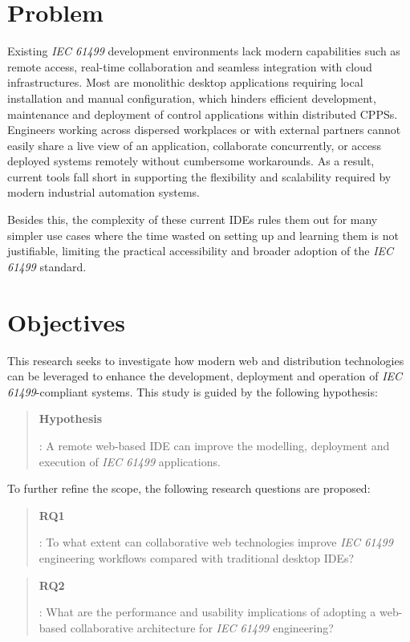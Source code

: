 \section{Problem}
Existing \textit{IEC 61499} development environments lack modern capabilities such as remote access, real-time collaboration and seamless integration with cloud infrastructures. Most are monolithic desktop applications requiring local installation and manual configuration, which hinders efficient development, maintenance and deployment of control applications within distributed \acp{CPPS}. Engineers working across dispersed workplaces or with external partners cannot easily share a live view of an application, collaborate concurrently, or access deployed systems remotely without cumbersome workarounds. As a result, current tools fall short in supporting the flexibility and scalability required by modern industrial automation systems.

Besides this, the complexity of these current \acp{IDE} rules them out for many simpler use cases where the time wasted on setting up and learning them is not justifiable, limiting the practical accessibility and broader adoption of the \textit{IEC 61499} standard.

\section{Objectives}
This research seeks to investigate how modern web and distribution technologies can be leveraged to enhance the development, deployment and operation of \textit{IEC 61499}-compliant systems. This study is guided by the following hypothesis:
\begin{quote}
\hypertarget{hypothesis}{\textbf{Hypothesis}}: A remote web-based \ac{IDE} can improve the modelling, deployment and execution of \textit{IEC 61499} applications.
\end{quote}

\noindent To further refine the scope, the following research questions are proposed:
\begin{quote}
\hypertarget{rq1}{\textbf{RQ1}}: To what extent can collaborative web technologies improve \textit{IEC 61499} engineering workflows compared with traditional desktop \acp{IDE}?
\end{quote}

\begin{quote}
\hypertarget{rq2}{\textbf{RQ2}}: What are the performance and usability implications of adopting a web-based collaborative architecture for \textit{IEC 61499} engineering?
\end{quote}

